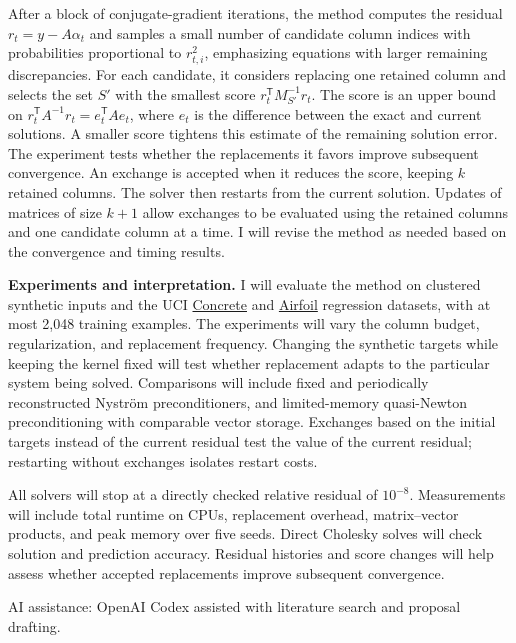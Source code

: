 \documentclass[11pt,letterpaper]{article}
\newcommand{\nystrom}{Nystr\"om}
\begin{document}
After a block of conjugate-gradient iterations, the method computes the residual
$r_t=y-A\alpha_t$ and samples a small number of candidate column indices with
probabilities proportional to $r_{t,i}^2$, emphasizing equations with larger
remaining discrepancies.
For each candidate, it considers replacing one retained column and selects the set
$S'$ with the smallest score $r_t^{\mathsf T}M_{S'}^{-1}r_t$.
The score is an upper bound on $r_t^{\mathsf T}A^{-1}r_t=e_t^{\mathsf T}Ae_t$,
where $e_t$ is the difference between the exact and current solutions.
A smaller score tightens this estimate of the remaining solution error.
The experiment tests whether the replacements it favors improve subsequent convergence.
An exchange is accepted when it reduces the score, keeping $k$ retained columns.
The solver then restarts from the current solution.
Updates of matrices of size $k+1$ allow exchanges to be evaluated using the
retained columns and one candidate column at a time.
I will revise the method as needed based on the convergence and timing results.

\textbf{Experiments and interpretation.}
I will evaluate the method on clustered synthetic inputs and the UCI
\href{https://archive.ics.uci.edu/dataset/165/concrete+compressive+strength}{Concrete}
and \href{https://archive.ics.uci.edu/dataset/291/airfoil+self+noise}{Airfoil}
regression datasets, with at most 2,048 training examples.
The experiments will vary the column budget, regularization, and replacement frequency.
Changing the synthetic targets while keeping the kernel fixed will test
whether replacement adapts to the particular system being solved.
Comparisons will include fixed and periodically reconstructed \nystrom{} preconditioners,
and limited-memory quasi-Newton preconditioning with comparable vector storage.
Exchanges based on the initial targets instead of the current residual test the
value of the current residual; restarting without exchanges isolates restart costs.

All solvers will stop at a directly checked relative residual of $10^{-8}$.
Measurements will include total runtime on CPUs, replacement overhead,
matrix--vector products, and peak memory over five seeds.
Direct Cholesky solves will check solution and prediction accuracy.
Residual histories and score changes will help assess whether accepted
replacements improve subsequent convergence.

\vspace{-2pt}
{\footnotesize
\setlength{\parskip}{0pt}


}
\vspace{-3pt}
{\scriptsize AI assistance: OpenAI Codex assisted with literature search and proposal drafting.}
\end{document}

